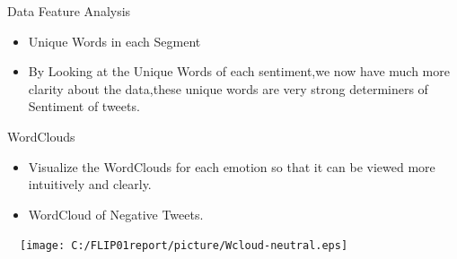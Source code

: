 \documentclass[
 size=14pt,
 paper=smartboard,  %
 mode=present, 		%
 display=slides, 	%
 style=tuliplab,  	%
 pauseslide,
 fleqn,leqno]{powerdot}
\begin{document}
\begin{slide}[toc=,bm=]{Data Feature Analysis}
\begin{itemize}
\item
Unique Words in each Segment
\item
By Looking at the Unique Words of each sentiment,we now have much more clarity about the data,these unique words are very strong determiners of Sentiment of tweets.
\end{itemize}
\vspace{-0.8cm}
\begin{figure}[htbp]
\centering
{}%
%
%
\centering
\end{figure}
\end{slide}


\begin{slide}[toc=,bm=]{WordClouds}
\begin{itemize}
\item
Visualize the WordClouds for each emotion so that it can be viewed more intuitively and clearly.
\item
WordCloud of Negative Tweets.
\end{itemize}
\vspace{-0.8cm}
\begin{center}
  \texttt{[image: C:/FLIP01report/picture/Wcloud-neutral.eps]}
\end{center}
\end{slide}

\end{document}
